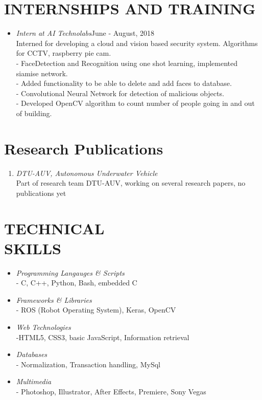 \documentclass[margin]{res}
\begin{document}
\begin{resume}
\section{INTERNSHIPS AND TRAINING} \begin{itemize}
 \item{\large{\sl Intern at AI Technolabs}}\hfill June - August, 2018 \\
 	Interned for developing a cloud and vision based security system. Algorithms for CCTV, raspberry pie cam.\\
	- FaceDetection and Recognition using one shot learning, implemented siamise network.\\
	- Added functionality to be able to delete and add faces to database.\\
	- Convolutional Neural Network for detection of malicious objects.\\
	- Developed OpenCV algorithm to count number of people going in and out of building.\\
 \end{itemize}

\section{Research Publications}\begin{enumerate}
\item {\sl DTU-AUV, Autonomous Underwater Vehicle  }\\
	Part of research team DTU-AUV, working on several research papers, no publications yet

\end{enumerate}

\section{TECHNICAL  \\ SKILLS} \begin{itemize}
\item {\sl Programming Langauges \& Scripts }\\
	- C, C++, Python, Bash,  embedded C
\item {\sl Frameworks \& Libraries}\\
	- ROS (Robot Operating System),  Keras, OpenCV
\item {\sl Web Technologies}\\
	 -HTML5, CSS3, basic JavaScript, Information retrieval
 \item{\sl Databases}\\
	- Normalization, Transaction handling, MySql
 \item{\sl Multimedia}\\
	- Photoshop, Illustrator, After Effects, Premiere, Sony Vegas
\end{itemize}


\end{resume}
\end{document}
